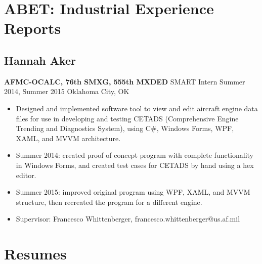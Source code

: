 \section{ABET:  Industrial Experience Reports}

\subsection{Hannah Aker}

{\bf AFMC-OCALC, 76th SMXG, 555th MXDED}
SMART Intern
Summer 2014, Summer 2015
Oklahoma City, OK
\begin{itemize}
\item Designed and implemented software tool to view and edit aircraft engine data files for use in developing and testing CETADS (Comprehensive Engine Trending and Diagnostics System), using C\#, Windows Forms, WPF, XAML, and MVVM architecture. 
\item Summer 2014: created proof of concept program with complete functionality in Windows Forms, and created test cases for CETADS by hand using a hex editor. 
\item Summer 2015: improved original program using WPF, XAML, and MVVM structure, then recreated the program for a different engine.
\item Supervisor: Francesco Whittenberger, francesco.whittenberger@us.af.mil
\end{itemize}

\section{Resumes}




%     
%     
%     







